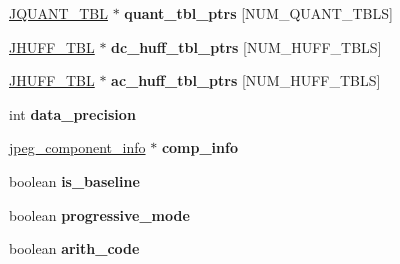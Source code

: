 \begin{DoxyCompactItemize}
\item 
\hypertarget{structjpeg__decompress__struct_a42be2e7197a38cf83e6cebbaac006ca6}{\hyperlink{struct_j_q_u_a_n_t___t_b_l}{J\+Q\+U\+A\+N\+T\+\_\+\+T\+B\+L} $\ast$ {\bfseries quant\+\_\+tbl\+\_\+ptrs} \mbox{[}N\+U\+M\+\_\+\+Q\+U\+A\+N\+T\+\_\+\+T\+B\+L\+S\mbox{]}}\label{structjpeg__decompress__struct_a42be2e7197a38cf83e6cebbaac006ca6}

\item 
\hypertarget{structjpeg__decompress__struct_a805ecdbfbc59d66a6879de06dc4c35e0}{\hyperlink{struct_j_h_u_f_f___t_b_l}{J\+H\+U\+F\+F\+\_\+\+T\+B\+L} $\ast$ {\bfseries dc\+\_\+huff\+\_\+tbl\+\_\+ptrs} \mbox{[}N\+U\+M\+\_\+\+H\+U\+F\+F\+\_\+\+T\+B\+L\+S\mbox{]}}\label{structjpeg__decompress__struct_a805ecdbfbc59d66a6879de06dc4c35e0}

\item 
\hypertarget{structjpeg__decompress__struct_a8d6e49569f3edc0ad43ffa5d6a95bb48}{\hyperlink{struct_j_h_u_f_f___t_b_l}{J\+H\+U\+F\+F\+\_\+\+T\+B\+L} $\ast$ {\bfseries ac\+\_\+huff\+\_\+tbl\+\_\+ptrs} \mbox{[}N\+U\+M\+\_\+\+H\+U\+F\+F\+\_\+\+T\+B\+L\+S\mbox{]}}\label{structjpeg__decompress__struct_a8d6e49569f3edc0ad43ffa5d6a95bb48}

\item 
\hypertarget{structjpeg__decompress__struct_ad55d8fc56faa42d05d1a80ad84ce3e9c}{int {\bfseries data\+\_\+precision}}\label{structjpeg__decompress__struct_ad55d8fc56faa42d05d1a80ad84ce3e9c}

\item 
\hypertarget{structjpeg__decompress__struct_afb7ab593b5699842965eccb64e6e200a}{\hyperlink{structjpeg__component__info}{jpeg\+\_\+component\+\_\+info} $\ast$ {\bfseries comp\+\_\+info}}\label{structjpeg__decompress__struct_afb7ab593b5699842965eccb64e6e200a}

\item 
\hypertarget{structjpeg__decompress__struct_a7ba5fd9c43f0bd3161f1fc618aa39e37}{boolean {\bfseries is\+\_\+baseline}}\label{structjpeg__decompress__struct_a7ba5fd9c43f0bd3161f1fc618aa39e37}

\item 
\hypertarget{structjpeg__decompress__struct_a6e2f9fd1cba287dc632070f3c8390d1c}{boolean {\bfseries progressive\+\_\+mode}}\label{structjpeg__decompress__struct_a6e2f9fd1cba287dc632070f3c8390d1c}

\item 
\hypertarget{structjpeg__decompress__struct_aa59d02c7dfa58e22321c1f5fa154b151}{boolean {\bfseries arith\+\_\+code}}\label{structjpeg__decompress__struct_aa59d02c7dfa58e22321c1f5fa154b151}


\end{DoxyCompactItemize}
